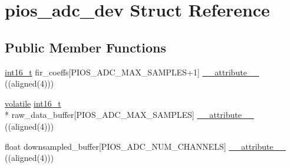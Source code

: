 \hypertarget{structpios__adc__dev}{\section{pios\-\_\-adc\-\_\-dev Struct Reference}
\label{structpios__adc__dev}
}
\subsection*{Public Member Functions}
\begin{DoxyCompactItemize}
\item 
\hyperlink{stdint_8h_aa343fa3b3d06292b959ffdd4c4703b06}{int16\-\_\-t} fir\-\_\-coeffs\mbox{[}P\-I\-O\-S\-\_\-\-A\-D\-C\-\_\-\-M\-A\-X\-\_\-\-S\-A\-M\-P\-L\-E\-S+1\mbox{]} \hyperlink{structpios__adc__dev_a80a322d42303ab984ec330a61f4b3304}{\-\_\-\-\_\-attribute\-\_\-\-\_\-} ((aligned(4)))
\item 
\hyperlink{group___c_m_s_i_s___core___instruction_interface_gad7d93af13046b0378601b85c8c16673b}{volatile} \hyperlink{stdint_8h_aa343fa3b3d06292b959ffdd4c4703b06}{int16\-\_\-t} \\*
raw\-\_\-data\-\_\-buffer\mbox{[}P\-I\-O\-S\-\_\-\-A\-D\-C\-\_\-\-M\-A\-X\-\_\-\-S\-A\-M\-P\-L\-E\-S\mbox{]} \hyperlink{structpios__adc__dev_ad6e093a33c7da0fd5b858296695fe38c}{\-\_\-\-\_\-attribute\-\_\-\-\_\-} ((aligned(4)))
\item 
float downsampled\-\_\-buffer\mbox{[}P\-I\-O\-S\-\_\-\-A\-D\-C\-\_\-\-N\-U\-M\-\_\-\-C\-H\-A\-N\-N\-E\-L\-S\mbox{]} \hyperlink{structpios__adc__dev_ad8e0f65a219b9eed7b8813d5f485f311}{\-\_\-\-\_\-attribute\-\_\-\-\_\-} ((aligned(4)))
\end{DoxyCompactItemize}
